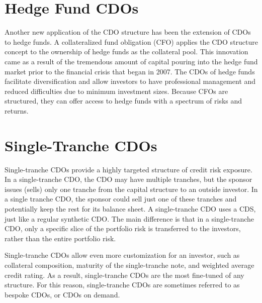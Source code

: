 \documentclass[11pt]{article}
\begin{document}
\section*{Hedge Fund CDOs}
Another new application of the CDO structure has been the extension of CDOs to hedge funds. A collateralized fund obligation (CFO) applies the CDO structure concept to the ownership of hedge funds as the collateral pool. This innovation came as a result of the tremendous amount of capital pouring into the hedge fund market prior to the financial crisis that began in 2007. The CDOs of hedge funds facilitate diversification and allow investors to have professional management and reduced difficulties due to minimum investment sizes. Because CFOs are structured, they can offer access to hedge funds with a spectrum of risks and returns.

\section*{Single-Tranche CDOs}
Single-tranche CDOs provide a highly targeted structure of credit risk exposure. In a single-tranche CDO, the CDO may have multiple tranches, but the sponsor issues (sells) only one tranche from the capital structure to an outside investor. In a single tranche CDO, the sponsor could sell just one of these tranches and potentially keep the rest for its balance sheet. A single-tranche CDO uses a CDS, just like a regular synthetic CDO. The main difference is that in a single-tranche CDO, only a specific slice of the portfolio risk is transferred to the investors, rather than the entire portfolio risk.

Single-tranche CDOs allow even more customization for an investor, such as collateral composition, maturity of the single-tranche note, and weighted average credit rating. As a result, single-tranche CDOs are the most fine-tuned of any structure. For this reason, single-tranche CDOs are sometimes referred to as bespoke CDOs, or CDOs on demand.
\end{document}
